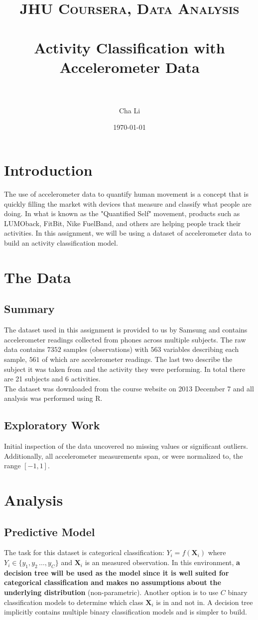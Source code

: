 \documentclass[paper=a4, fontsize=11pt]{scrartcl} %
\title{	
\normalfont \normalsize 
\textsc{JHU Coursera, Data Analysis} \\ [25pt] %
\horrule{0.5pt} \\[0.4cm] %
\huge Activity Classification with Accelerometer Data  \\ %
\horrule{2pt} \\[0.5cm] %
}
\author{Cha Li} %
\date{\normalsize\today} %
\numberwithin{equation}{section} %
\numberwithin{figure}{section} %
\numberwithin{table}{section} %
\begin{document}
\maketitle %

\section{Introduction}
The use of accelerometer data to quantify human movement is a concept that
is quickly filling the market with devices that measure and classify what
people are doing. In what is known as the "Quantified Self" movement,
products such as LUMOback, FitBit, Nike FuelBand, and others are helping people track their activities. In this assignment, we will be using a dataset of accelerometer
data to build an activity classification model.

\section{The Data}
\subsection{Summary}
The dataset used in this assignment is provided to us by Samsung and
 contains accelerometer readings collected from phones across multiple
 subjects. The raw data contains $7352$ samples (observations) with
 $563$ variables describing each sample, $561$ of which are accelerometer
 readings. The last two describe the subject it was taken from and the
 activity they were performing. In total there are 21 subjects and 6 
 activities. \\

The dataset was downloaded from the course website on 2013 December 7 and
all analysis was performed using R.

\subsection{Exploratory Work}
Initial inspection of the data uncovered no missing values or significant
outliers. Additionally, all accelerometer measurements span, or were normalized to, the range $[-1, 1]$. 

\section{Analysis}
\subsection{Predictive Model}
The task for this dataset is categorical classification: 
$Y_i = f(\mathbf{X}_i)$ where $Y_i \in \{y_1, y_2\, \dots, y_C\}$ and $\mathbf{X}_i$ is an measured observation. In this environment, \textbf{a decision
tree will be used as the model since it is well suited for categorical
classification and makes no assumptions about the underlying distribution}
(non-parametric). Another option is to use $C$ binary classification models to determine which class $\mathbf{X}_i$ is in and not in. A
 decision tree implicitly contains multiple binary classification models
  and is simpler to build.
\end{document}
